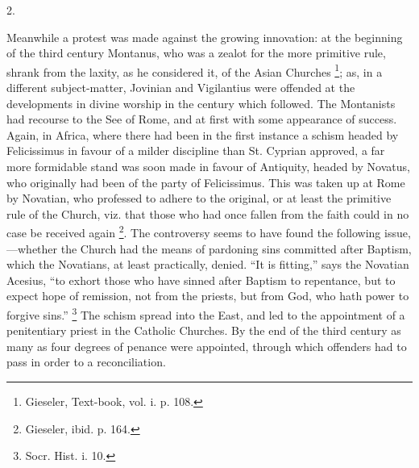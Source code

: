 2.

Meanwhile a protest was made against the growing innovation: at the
beginning of the third century Montanus, who was a zealot for the more
primitive rule, shrank from the laxity, as he considered it, of the
Asian Churches \footnote{Gieseler, Text-book, vol. i. p. 108.}; as, in a different subject-matter, Jovinian
and Vigilantius were offended at the developments in divine worship in
the century which followed. The Montanists had recourse to the See of
Rome, and at first with some appearance of success. Again, in Africa,
where there had been in the first instance a schism headed by
Felicissimus in favour of a milder discipline than St. Cyprian
approved, a far more formidable stand was soon made in favour of
Antiquity, headed by Novatus, who originally had been of the party of
Felicissimus. This was taken up at Rome by Novatian, who professed to
adhere to the original, or at least the primitive rule of the Church,
viz. that those who had once fallen from the faith could in no case be
received again \footnote{Gieseler, ibid. p. 164.}. The controversy seems to have found the
following issue,—whether the Church had the means of pardoning sins
committed after Baptism, which the Novatians, at least practically,
denied. ``It is fitting,'' says the Novatian Acesius, ``to
exhort those who have sinned after Baptism to repentance, but to
expect hope of remission, not from the priests, but from God, who hath
power to forgive sins.'' \footnote{Socr. Hist. i. 10.} The schism spread into the
East, and led to the appointment of a penitentiary priest in the
Catholic Churches. By the end of the third century as many as four
degrees of penance were appointed, through which offenders had to pass
in order to a reconciliation.


